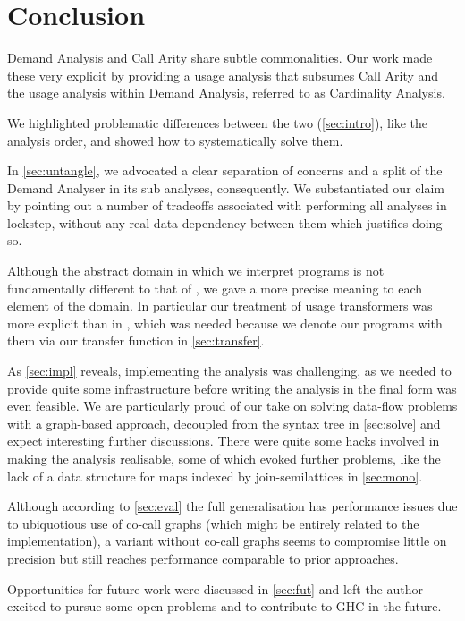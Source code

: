 \chapter{Conclusion}\label{sec:conclusion}

Demand Analysis and Call Arity share subtle commonalities.
Our work made these very explicit by providing a usage analysis that subsumes Call Arity and the usage analysis within Demand Analysis, referred to as Cardinality Analysis.

We highlighted problematic differences between the two (\cref{sec:intro}), like the  \vs {} analysis order, and showed how to systematically solve them.

In \cref{sec:untangle}, we advocated a clear separation of concerns and a split of the Demand Analyser in its sub analyses, consequently.
We substantiated our claim by pointing out a number of tradeoffs associated with performing all analyses in lockstep, without any real data dependency between them which justifies doing so.

Although the abstract domain in which we interpret programs is not fundamentally different to that of \textcite{card}, we gave a more precise meaning to each element of the domain.
In particular our treatment of usage transformers was more explicit than in \textcite{card}, which was needed because we denote our programs with them via our transfer function in \cref{sec:transfer}.

As \cref{sec:impl} reveals, implementing the analysis was challenging, as we needed to provide quite some infrastructure before writing the analysis in the final form was even feasible.
We are particularly proud of our take on solving data-flow problems with a graph-based approach, decoupled from the syntax tree in \cref{sec:solve} and expect interesting further discussions.
There were quite some hacks involved in making the analysis realisable, some of which evoked further problems, like the lack of a data structure for maps indexed by join-semilattices in \cref{sec:mono}.

Although according to \cref{sec:eval} the full generalisation has performance issues due to ubiquotious use of co-call graphs (which might be entirely related to the implementation), a variant without co-call graphs seems to compromise little on precision but still reaches performance comparable to prior approaches.

Opportunities for future work were discussed in \cref{sec:fut} and left the author excited to pursue some open problems and to contribute to GHC in the future.
